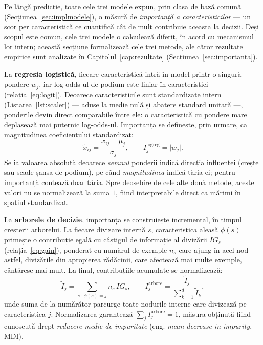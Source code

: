 \documentclass[12pt,a4paper]{report}
\begin{document}
Pe lângă predicție, toate cele trei modele expun, prin clasa de bază comună
(Secțiunea~\ref{sec:implmodele}), o măsură de \emph{importanță a caracteristicilor} --- un scor per
caracteristică ce cuantifică cât de mult contribuie aceasta la decizii. Deși scopul este comun, cele
trei modele o calculează diferit, în acord cu mecanismul lor intern; această secțiune formalizează
cele trei metode, ale căror rezultate empirice sunt analizate în Capitolul~\ref{cap:rezultate}
(Secțiunea~\ref{sec:importanta}).

La \textbf{regresia logistică}, fiecare caracteristică intră în model printr-o singură pondere $w_j$,
iar log-odds-ul de podium este liniar în caracteristici (relația~\eqref{eq:logit}). Deoarece
caracteristicile sunt standardizate intern (Listarea~\ref{lst:scaler}) --- aduse la medie nulă și
abatere standard unitară ---, ponderile devin direct comparabile între ele: o caracteristică cu
pondere mare deplasează mai puternic log-odds-ul. Importanța se definește, prin urmare, ca
magnitudinea coeficientului standardizat:
\begin{equation}
  \tilde{x}_{ij} = \frac{x_{ij} - \mu_j}{\sigma_j},
  \qquad
  I_j^{\text{logreg}} = \lvert w_j \rvert .
  \label{eq:imp-logreg}
\end{equation}
Se ia valoarea absolută deoarece \emph{semnul} ponderii indică direcția influenței (crește sau scade
șansa de podium), pe când \emph{magnitudinea} indică tăria ei; pentru importanță contează doar tăria.
Spre deosebire de celelalte două metode, aceste valori nu se normalizează la suma $1$, fiind
interpretabile direct ca mărimi în spațiul standardizat.

La \textbf{arborele de decizie}, importanța se construiește incremental, în timpul creșterii
arborelui. La fiecare divizare internă $s$, caracteristica aleasă $\phi(s)$ primește o contribuție
egală cu câștigul de informație al divizării $IG_s$ (relația~\eqref{eq:gain}), ponderat cu numărul de
exemple $n_s$ care ajung în acel nod --- astfel, divizările din apropierea rădăcinii, care afectează
mai multe exemple, cântăresc mai mult. La final, contribuțiile acumulate se normalizează:
\begin{equation}
  \tilde{I}_j = \sum_{s \,:\, \phi(s) = j} n_s \, IG_s,
  \qquad
  I_j^{\text{arbore}} = \frac{\tilde{I}_j}{\sum_{k=1}^{d} \tilde{I}_k},
  \label{eq:imp-tree}
\end{equation}
unde suma de la numărător parcurge toate nodurile interne care divizează pe caracteristica $j$.
Normalizarea garantează $\sum_j I_j^{\text{arbore}} = 1$, măsura obținută fiind cunoscută drept
\emph{reducere medie de impuritate} (eng. \emph{mean decrease in impurity}, MDI).
\end{document}

